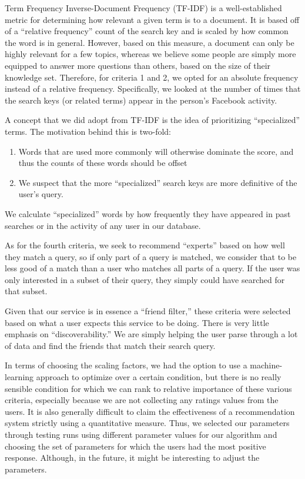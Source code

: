 Term Frequency Inverse-Document Frequency (TF-IDF)  is a
well-established metric for determining how relevant a given term is to a
document. It is based off of a ``relative frequency'' count of the search key
and is scaled by how common the word is in general. However, based on this
measure, a document can only be highly relevant for a few topics, whereas we
believe some people are simply more equipped to answer more questions than
others, based on the size of their knowledge set. Therefore, for criteria 1 and
2, we opted for an absolute frequency instead of a relative frequency.
Specifically, we looked at the number of times that the search keys (or related
terms) appear in the person's Facebook activity.

A concept that we did adopt from TF-IDF is the idea of prioritizing
``specialized'' terms. The motivation behind this is two-fold: \begin{enumerate}
\item Words that are used more commonly will otherwise dominate the score, and
thus the counts of these words should be offset
\item We suspect that the more ``specialized'' search keys are more definitive
of the user's query.
\end{enumerate}

We calculate ``specialized'' words by how frequently they have appeared in past
searches or in the activity of any user in our database.

As for the fourth criteria, we seek to recommend ``experts'' based on how well
they match a query, so if only part of a query is matched, we consider that to
be less good of a match than a user who matches all parts of a query. If the
user was only interested in a subset of their query, they simply could have
searched for that subset.

Given that our service is in essence a ``friend filter,'' these criteria were
selected based on what a user expects this service to be doing. There is very
little emphasis on ``discoverability.'' We are simply helping the user parse
through a lot of data and find the friends that match their search query.

In terms of choosing the scaling factors, we had the option to use a
machine-learning approach to optimize over a certain condition, but there is no
really sensible condition for which we can rank to relative importance of these
various criteria, especially because we are not collecting any ratings values
from the users. It is also generally difficult to claim the effectiveness of a
recommendation system strictly using a quantitative measure. Thus, we selected
our parameters through testing runs using different parameter values for our
algorithm and choosing the set of parameters for which the users had the most
positive response. Although, in the future, it might be interesting to adjust
the parameters.




